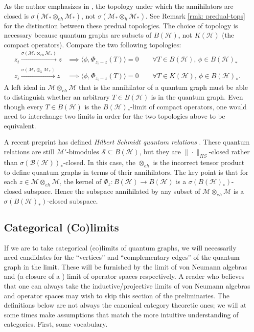 \documentclass[12pt]{article}
\theoremstyle{definition}
\newenvironment{remark}
  {\pushQED{\qed}\renewcommand{\qedsymbol}{\textcircled{\tiny R}}\remarkx}
  {\popQED\endremarkx}
\newcommand{\mc}[1]{\mathcal{#1}}
\newcommand{\<}{\langle}
\renewcommand{\>}{\rangle}
\renewcommand{\subset}{\subseteq}
\newcommand{\eh}{\otimes_{eh}}
\begin{document}
\begin{remark}
    As the author emphasizes in \cite[Section 3]{gp-obs}, the topology under which the annihilators are closed is $\sigma(\mc M_*\otimes_{eh} \mc M_*)$, not $\sigma(\mc M_* \otimes_h \mc M_*)$. See Remark \ref{rmk: predual-tops} for the distinction between these predual topologies. The choice of topology is necessary because quantum graphs are subsets of $B(\mc H)$, not $K(\mc H)$ (the compact operators). Compare the two following topologies:
    \begin{align*}
        z_i \overset{\sigma(\mc M_* \eh \mc M_*)}{\longrightarrow} z &\implies \< \phi, \Phi_{z_i - z}(T) \> = 0 \qquad \forall T \in B(\mc H), \, \phi \in B(\mc H)_* \\
        z_i \overset{\sigma(\mc M_* \otimes_h \mc M_*)}{\longrightarrow} z &\implies \< \phi, \Phi_{z_i - z}(T)\> = 0 \qquad \forall T \in K(\mc H), \, \phi \in B(\mc H)_*.
    \end{align*}
    A left ideal in $\mc M \eh \mc M$ that is the annihilator of a quantum graph must be able to distinguish whether an arbitrary $T \in B(\mc H)$ is in the quantum graph. Even though every $T \in B(\mc H)$ is the $B(\mc H)_*$-limit of compact operators, one would need to interchange two limits in order for the two topologies above to be equivalent. 
\end{remark}

\begin{remark}
    A recent preprint has defined \textit{Hilbert Schmidt quantum relations} \cite[Definition 4.1]{hsqgraphs}. These quantum relations are still $\mc M'$-bimodules $\mc S \subset B(\mc H)$, but they are $\|\cdot \|_{HS}$-closed rather than $\sigma(\mc B(\mc H))_*$-closed. In this case, the $\otimes_{eh}$ is the incorrect tensor product to define quantum graphs in terms of their annihilators. The key point is that for each $z \in \mc M \eh \mc M$, the kernel of $\Phi_z: B(\mc H) \to B(\mc H)$ is a $\sigma(B(\mc H)_*)$-closed subspace. Hence the subspace annihilated by any subset of $\mc M \eh \mc M$ is a $\sigma(B(\mc H)_*)$-closed subspace. 
\end{remark}

\subsection{Categorical (Co)limits} \label{subsec: cat}

If we are to take categorical (co)limits of quantum graphs, we will necessarily need candidates for the ``vertices'' and ``complementary edges'' of the quantum graph in the limit. These will be furnished by the limit of von Neumann algebras and (a closure of a ) limit of operator spaces respectively. A reader who believes that one can always take the inductive/projective limits of von Neumann algebras and operator spaces may wish to skip this section of the preliminaries. The definitions below are not always the canonical category theoretic ones; we will at some times make assumptions that match the more intuitive understanding of categories. First, some vocabulary. 
\end{document}
